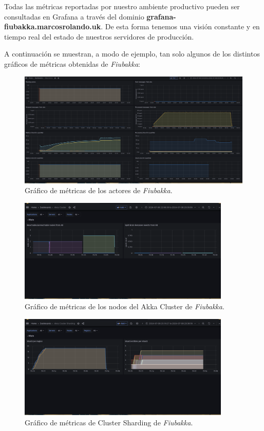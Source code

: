 Todas las métricas reportadas por nuestro ambiente productivo pueden ser consultadas en Grafana a través del dominio \textbf{grafana-fiubakka.marcosrolando.uk}. De esta forma tenemos una visión constante y en tiempo real del estado de nuestros servidores de producción.

A continuación se muestran, a modo de ejemplo, tan solo algunos de los distintos gráficos de métricas obtenidas de \textit{Fiubakka}:

\begin{figure}[htbp]
    \centering
    \includegraphics[width=1\textwidth]{../assets/actors-metrics.png}
    \caption{Gráfico de métricas de los actores de \textit{Fiubakka}.}
\end{figure}

\newpage

\begin{figure}[htbp]
    \centering
    \includegraphics[width=0.9\textwidth]{../assets/cluster-metrics.png}
    \caption{Gráfico de métricas de los nodos del Akka Cluster de \textit{Fiubakka}.}
\end{figure}

\begin{figure}[htbp]
    \centering
    \includegraphics[width=0.9\textwidth]{../assets/cluster-sharding-metrics.png}
    \caption{Gráfico de métricas de Cluster Sharding de \textit{Fiubakka}.}
\end{figure}

